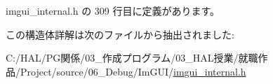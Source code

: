  imgui\+\_\+internal.\+h の 309 行目に定義があります。



この構造体詳解は次のファイルから抽出されました\+:\begin{DoxyCompactItemize}
\item 
C\+:/\+H\+A\+L/\+P\+G関係/03\+\_\+作成プログラム/03\+\_\+\+H\+A\+L授業/就職作品/\+Project/source/06\+\_\+\+Debug/\+Im\+G\+U\+I/\mbox{\hyperlink{imgui__internal_8h}{imgui\+\_\+internal.\+h}}\end{DoxyCompactItemize}
